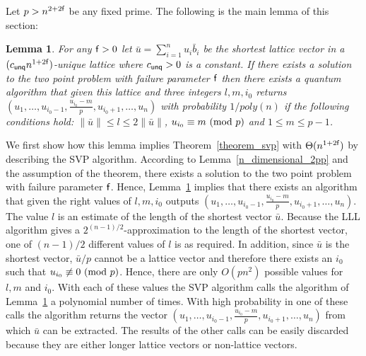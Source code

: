 \documentclass[11pt]{article}
\newtheorem{lemma}[theorem]{Lemma}
\def\mod{{\rm mod}}
\newcommand\C[1]{{ c_{\sf {#1}} }}
\begin{document}
Let $p > n^{2+2{\sf f}}$ be any fixed prime. The following is the main lemma of this section:

\begin{lemma}\label{main_lattice_lemma}
For any ${\sf f}>0$ let $\bar{u}=\sum_{i=1}^{n} u_i \bar{b}_i$ be the shortest lattice vector in a $(\C{unq} n^{1+2{\sf
f}})$-unique lattice where $\C{unq}>0$ is a constant. If there exists a solution to the two point problem with failure
parameter ${\sf f}$ then there exists a quantum algorithm that given this lattice and three integers $l,m,i_0$ returns
$(u_1,\ldots,u_{i_0-1},\frac{u_{i_0}-m}{p},u_{i_0+1},\ldots,u_n)$ with probability $1/poly(n)$ if the following
conditions hold: $\|\bar{u}\| \le l \le 2\|\bar{u}\|$, $u_{i_0}\equiv m~(\mod~p)$ and $1\le m\le p-1$.
\end{lemma}

We first show how this lemma implies Theorem~\ref{theorem_svp} with $\Theta(n^{1+2{\sf f}})$ by describing the SVP
algorithm. According to Lemma~\ref{n_dimensional_2pp} and the assumption of the theorem, there exists a solution to the
two point problem with failure parameter ${\sf f}$. Hence, Lemma~\ref{main_lattice_lemma} implies that there exists an
algorithm that given the right values of $l,m,i_0$ outputs
$(u_1,\ldots,u_{i_0-1},\frac{u_{i_0}-m}{p},u_{i_0+1},\ldots,u_n)$. The value $l$ is an estimate of the length of the
shortest vector $\bar{u}$. Because the LLL algorithm gives a $2^{(n-1)/2}$-approximation to the length of the shortest
vector, one of $(n-1)/2$ different values of $l$ is as required. In addition, since $\bar{u}$ is the shortest vector,
$\bar{u}/p$ cannot be a lattice vector and therefore there exists an $i_0$ such that $u_{i_0}\not\equiv 0~(\mod~p)$.
Hence, there are only $O(pn^2)$ possible values for $l,m$ and $i_0$. With each of these values the SVP algorithm calls
the algorithm of Lemma~\ref{main_lattice_lemma} a polynomial number of times. With high probability in one of these
calls the algorithm returns the vector $(u_1,\ldots,u_{i_0-1},\frac{u_{i_0}-m}{p},u_{i_0+1},\ldots,u_n)$ from which
$\bar{u}$ can be extracted. The results of the other calls can be easily discarded because they are either longer
lattice vectors or non-lattice vectors.
\end{document}
